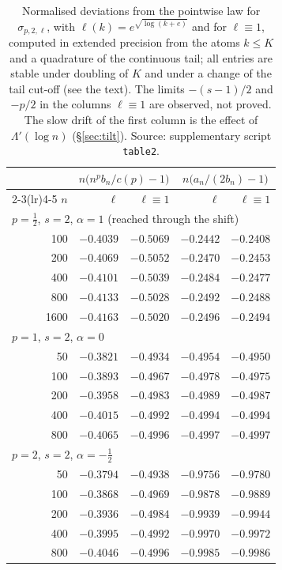 \begin{table}[ht]
\centering
\small
\begin{tabular}{rrrrr}
\toprule
 & \multicolumn{2}{c}{$n\bigl(n^pb_n/c(p)-1\bigr)$} & \multicolumn{2}{c}{$n\bigl(a_n/(2b_n)-1\bigr)$}\\
\cmidrule(lr){2-3}\cmidrule(lr){4-5}
$n$ & $\ell$ & $\ell\equiv1$ & $\ell$ & $\ell\equiv1$\\
\midrule
\multicolumn{5}{l}{$p=\frac12$, $s=2$, $\alpha=1$ (reached through the shift)}\\
 100 & $-0.4039$ & $-0.5069$ & $-0.2442$ & $-0.2408$\\
 200 & $-0.4069$ & $-0.5052$ & $-0.2470$ & $-0.2453$\\
 400 & $-0.4101$ & $-0.5039$ & $-0.2484$ & $-0.2477$\\
 800 & $-0.4133$ & $-0.5028$ & $-0.2492$ & $-0.2488$\\
1600 & $-0.4163$ & $-0.5020$ & $-0.2496$ & $-0.2494$\\
\midrule
\multicolumn{5}{l}{$p=1$, $s=2$, $\alpha=0$}\\
  50 & $-0.3821$ & $-0.4934$ & $-0.4954$ & $-0.4950$\\
 100 & $-0.3893$ & $-0.4967$ & $-0.4978$ & $-0.4975$\\
 200 & $-0.3958$ & $-0.4983$ & $-0.4989$ & $-0.4987$\\
 400 & $-0.4015$ & $-0.4992$ & $-0.4994$ & $-0.4994$\\
 800 & $-0.4065$ & $-0.4996$ & $-0.4997$ & $-0.4997$\\
\midrule
\multicolumn{5}{l}{$p=2$, $s=2$, $\alpha=-\frac12$}\\
  50 & $-0.3794$ & $-0.4938$ & $-0.9756$ & $-0.9780$\\
 100 & $-0.3868$ & $-0.4969$ & $-0.9878$ & $-0.9889$\\
 200 & $-0.3936$ & $-0.4984$ & $-0.9939$ & $-0.9944$\\
 400 & $-0.3995$ & $-0.4992$ & $-0.9970$ & $-0.9972$\\
 800 & $-0.4046$ & $-0.4996$ & $-0.9985$ & $-0.9986$\\
\bottomrule
\end{tabular}
\caption{Normalised deviations from the pointwise law for $\sigma_{p,2,\ell}$, with $\ell(k)=e^{\sqrt{\log(k+e)}}$ and
for $\ell\equiv1$, computed in extended precision from the
atoms $k\le K$ and a quadrature of the continuous tail; all entries are stable under doubling of $K$ and under a change
of the tail cut-off (see the text). The limits $-(s-1)/2$ and $-p/2$ in the columns $\ell\equiv1$ are observed, not
proved. The slow drift of the first column is the effect of $\Lambda'(\log n)$
(\S\ref{sec:tilt}). Source: supplementary script \texttt{table2}.}
\label{tab:numerics}
\end{table}

